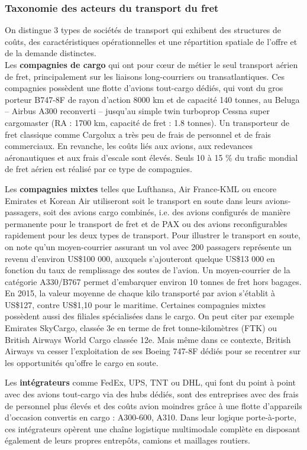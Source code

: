 \subsubsection{Taxonomie des acteurs du transport du fret}
\label{taxonomie}
On distingue 3 types de sociétés de transport qui exhibent des structures de coûts, des caractéristiques opérationnelles et une répartition spatiale de l'offre et de la demande distinctes.\\


Les \textbf{compagnies de cargo} qui ont pour cœur de métier le seul transport aérien de fret, principalement sur les liaisons long-courriers ou transatlantiques. Ces compagnies possèdent une flotte d'avions tout-cargo dédiés, qui vont du gros porteur B747-8F de rayon d'action 8000 km et de capacité 140 tonnes, au Beluga – Airbus A300 reconverti – jusqu'au simple twin turboprop Cessna super cargomaster (RA : 1700 km, capacité de fret : 1.8 tonnes). Un transporteur de fret classique comme Cargolux a très peu de frais de personnel et de frais commerciaux. En revanche, les coûts liés aux avions, aux redevances aéronautiques et aux frais d’escale sont élevés. Seuls 10 à 15 \% du trafic mondial de fret aérien est réalisé par ce type de compagnies. \cite{popescu}
	
Les \textbf{compagnies mixtes} telles que Lufthansa, Air France-KML ou encore Emirates et Korean Air utiliseront soit le transport en soute dans leurs avions-passagers, soit des avions cargo combinés, i.e. des avions configurés de manière permanente pour le transport de fret et de PAX ou des avions reconfigurables rapidement pour les deux types de transport. Pour illustrer le transport en soute, on note qu'un moyen-courrier assurant un vol avec 200 passagers représente un revenu d’environ US\$100 000, auxquels s’ajouteront quelque US\$13 000 en fonction du taux de remplissage des soutes de l’avion. Un moyen-courrier de la catégorie A330/B767 permet d’embarquer environ 10 tonnes de fret hors bagages. En 2015, la valeur moyenne de chaque kilo transporté par avion s’établit à US\$127, contre US\$1,10 pour le maritime.
Certaines compagnies mixtes possèdent aussi des filiales spécialisées dans le cargo. On peut citer par exemple Emirates SkyCargo, classée 3e en terme de fret tonne-kilomètres (FTK) ou British Airways World Cargo classée 12e. Mais même dans ce contexte, British Airways va cesser l'exploitation de ses Boeing 747-8F dédiés pour se recentrer sur les opportunités qu'offre le cargo en soute. \cite{theEconomist01}

Les \textbf{intégrateurs}\label{integrateurs} comme FedEx, UPS, TNT ou DHL, qui font du point à point avec des avions tout-cargo via des hubs dédiés, sont des entreprises avec des frais de personnel plus élevés et des coûts avion moindres grâce à une flotte d'appareils d’occasion convertis en cargo : A300-600, A310. \cite{lantenne} Dans leur logique porte-à-porte, ces intégrateurs opèrent une chaîne logistique multimodale complète en disposant également de leurs propres entrepôts, camions et maillages routiers.\\

